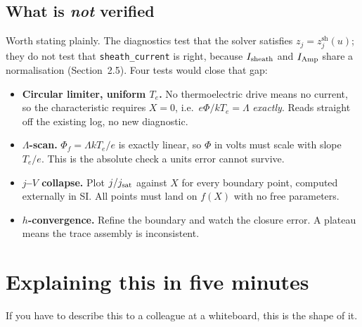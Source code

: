\documentclass[11pt,a4paper]{article}
\newcommand{\zj}{z_j}
\newcommand{\zjsh}{z^{\mathrm{sh}}_{j}}
\newcommand{\code}[1]{\texttt{\small #1}}
\begin{document}
\subsection{What is \emph{not} verified}

Worth stating plainly. The diagnostics test that the solver satisfies $\zj=\zjsh(u)$; they do not test
that \code{sheath\_current} is right, because $I_{\rm sheath}$ and $I_{\rm Amp}$ share a normalisation
(Section~2.5). Four tests would close that gap:

\begin{itemize}\itemsep3pt
\item \textbf{Circular limiter, uniform $T_e$.} No thermoelectric drive means no current, so the
  characteristic requires $X=0$, i.e.\ $e\Phi/kT_e = \Lambda$ \emph{exactly}. Reads straight off the
  existing log, no new diagnostic.
\item \textbf{$\Lambda$-scan.} $\Phi_f=\Lambda kT_e/e$ is exactly linear, so $\Phi$ in volts must
  scale with slope $T_e/e$. This is the absolute check a units error cannot survive.
\item \textbf{$j$--$V$ collapse.} Plot $j/j_{\rm sat}$ against $X$ for every boundary point, computed
  externally in SI. All points must land on $f(X)$ with no free parameters.
\item \textbf{$h$-convergence.} Refine the boundary and watch the closure error. A plateau means the
  trace assembly is inconsistent.
\end{itemize}

\section{Explaining this in five minutes}

If you have to describe this to a colleague at a whiteboard, this is the shape of it.
\end{document}
